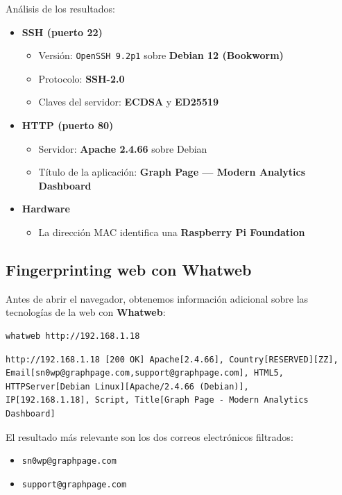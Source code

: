 \documentclass[12pt,a4paper]{article}
\begin{document}
Análisis de los resultados:

\begin{itemize}
  \item \textbf{SSH (puerto 22)}
  \begin{itemize}
    \item Versión: \texttt{OpenSSH 9.2p1} sobre \textbf{Debian 12 (Bookworm)}
    \item Protocolo: \textbf{SSH-2.0}
    \item Claves del servidor: \textbf{ECDSA} y \textbf{ED25519}
  \end{itemize}
  \item \textbf{HTTP (puerto 80)}
  \begin{itemize}
    \item Servidor: \textbf{Apache 2.4.66} sobre Debian
    \item Título de la aplicación: \textbf{Graph Page — Modern Analytics Dashboard}
  \end{itemize}
  \item \textbf{Hardware}
  \begin{itemize}
    \item La dirección MAC identifica una \textbf{Raspberry Pi Foundation}
  \end{itemize}
\end{itemize}

\subsection{Fingerprinting web con Whatweb}

Antes de abrir el navegador, obtenemos información adicional sobre las tecnologías de la web con \textbf{Whatweb}:

\begin{lstlisting}[language=bash]
whatweb http://192.168.1.18
\end{lstlisting}

\begin{lstlisting}[style=output]
http://192.168.1.18 [200 OK] Apache[2.4.66], Country[RESERVED][ZZ],
Email[sn0wp@graphpage.com,support@graphpage.com], HTML5,
HTTPServer[Debian Linux][Apache/2.4.66 (Debian)],
IP[192.168.1.18], Script, Title[Graph Page - Modern Analytics Dashboard]
\end{lstlisting}

El resultado más relevante son los dos correos electrónicos filtrados:

\begin{itemize}
  \item \texttt{sn0wp@graphpage.com}
  \item \texttt{support@graphpage.com}
\end{itemize}
\end{document}
